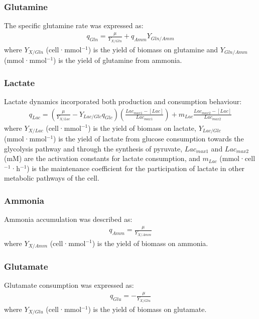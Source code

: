 \subsubsection*{Glutamine}
The specific glutamine rate was expressed as:
\begin{align}
q_{Gln} = \frac{\mu}{Y_{X/Gln}} + q_{Amm} Y_{Gln/Amm}
\end{align}
\noindent where $Y_{X/Gln}$ (cell·mmol$^{-1}$) is the yield of biomass on glutamine and $Y_{Gln/Amm}$ (mmol·mmol$^{-1}$) is the yield of glutamine from ammonia.

\subsubsection*{Lactate}
Lactate dynamics incorporated both production and consumption behaviour:
\begin{align}
q_{Lac} =
\left( \frac{\mu}{Y_{X/Lac}} - Y_{Lac/Glc} q_{Glc} \right)
\left( \frac{Lac_{max1} - [Lac]}{Lac_{max1}} \right)
+ m_{Lac} \frac{Lac_{max2} - [Lac]}{Lac_{max2}}
\end{align}
\noindent where $Y_{X/Lac}$ (cell·mmol$^{-1}$) is the yield of biomass on lactate, $Y_{Lac/Glc}$ (mmol·mmol$^{-1}$) is the yield of lactate from glucose consumption towards the glycolysis pathway and through the synthesis of pyruvate, $Lac_{max1}$ and $Lac_{max2}$ (mM) are the activation constants for lactate consumption, and $m_{Lac}$ (mmol·cell$^{-1}$·h$^{-1}$) is the maintenance coefficient for the
participation of lactate in other metabolic pathways of the cell.

\subsubsection*{Ammonia}
Ammonia accumulation was described as:
\begin{align}
q_{Amm} = \frac{\mu}{Y_{X/Amm}} 
\end{align}
\noindent where $Y_{X/Amm}$ (cell·mmol$^{-1}$) is the yield of biomass on ammonia.

\subsubsection*{Glutamate}
Glutamate consumption was expressed as:
\begin{align}
q_{Glu} = -\frac{\mu}{Y_{X/Glu}}
\end{align}
\noindent where $Y_{X/Glu}$ (cell·mmol$^{-1}$) is the yield of biomass on glutamate.

